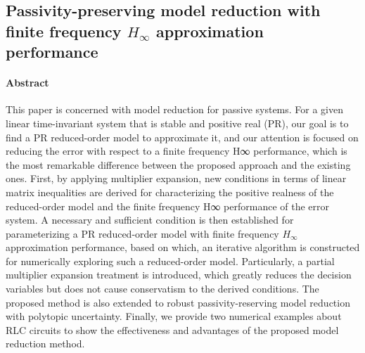        \subsection*{Passivity-preserving model reduction with finite frequency $H_{\infty}$ approximation performance\cite{Li2014}}

            \paragraph{Abstract}

                This paper is concerned with model reduction for passive systems. For a given linear time-invariant system that is stable and positive real (PR), our goal is to find a PR reduced-order model to approximate it, and our attention is focused on reducing the error with respect to a finite frequency H∞ performance, which is the most remarkable difference between the proposed approach and the existing ones. First, by applying multiplier expansion, new conditions in terms of linear matrix inequalities are derived for characterizing the positive realness of the reduced-order model and the finite frequency H∞ performance of the error system. A necessary and sufficient condition is then established for parameterizing a PR reduced-order model with finite frequency $H_{\infty}$ approximation performance, based on which, an iterative algorithm is constructed for numerically exploring such a reduced-order model. Particularly, a partial multiplier expansion treatment is introduced, which greatly reduces the decision variables but does not cause conservatism to the derived conditions. The proposed method is also extended to robust passivity-reserving model reduction with polytopic uncertainty. Finally, we provide two numerical examples about RLC circuits to show the effectiveness and advantages of the proposed model reduction method.

    
    
